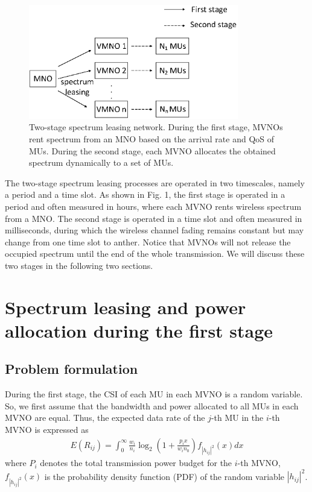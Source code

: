 \documentclass[journal]{IEEEtran}
\begin{document}
\begin{figure}
	\centering
	\includegraphics[width=3.6in]{Pic1.eps}
	\caption{Two-stage spectrum leasing network. During the first stage, MVNOs rent spectrum from an MNO based on the arrival rate and QoS of MUs. During the second stage, each MVNO allocates the obtained spectrum dynamically to a set of MUs.}
\end{figure}

The two-stage spectrum leasing processes are operated in two timescales, namely a period and a time slot. As shown in Fig. 1, the first stage is operated in a period and often measured in hours, where each MVNO rents wireless spectrum from a MNO. The second stage is operated in a time slot and often measured in milliseconds, during which the  wireless channel fading remains constant but may change from one time slot to anther. Notice that MVNOs will not release the occupied spectrum until the end of the whole transmission. We will discuss these two stages in the following two sections.

\section{Spectrum leasing and power allocation during the first stage}

\subsection{Problem formulation}
During the first stage, the CSI of each MU in each MVNO is a random variable. So, we first assume that the bandwidth and power allocated to all MUs in each MVNO are equal. Thus, the expected data rate of the $j$-th MU in the $i$-th MVNO is expressed as
\begin{align}
E\left({R}_{ij}\right) = \int_{0}^{\infty} \frac{w_i}{n_i} \log_2\left(1 + \frac{p_i x}{w_i n_0}\right) f_{\left|h_{ij} \right|^2} \left(x\right)dx
\end{align}
where $P_i$ denotes the total transmission power budget for the $i$-th MVNO, $f_{\left|h_{ij} \right|^2} \left(x\right)$ is the probability density function (PDF) of the random variable $\left|h_{ij} \right|^2$. 
\end{document}
